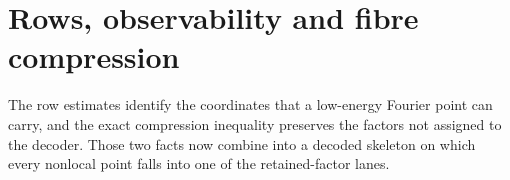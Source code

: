 \section{Rows, observability and fibre compression}

The row estimates identify the coordinates that a low-energy Fourier point can carry, and the exact compression inequality preserves the factors not assigned to the decoder.  Those two facts now combine into a decoded skeleton on which every nonlocal point falls into one of the retained-factor lanes.
